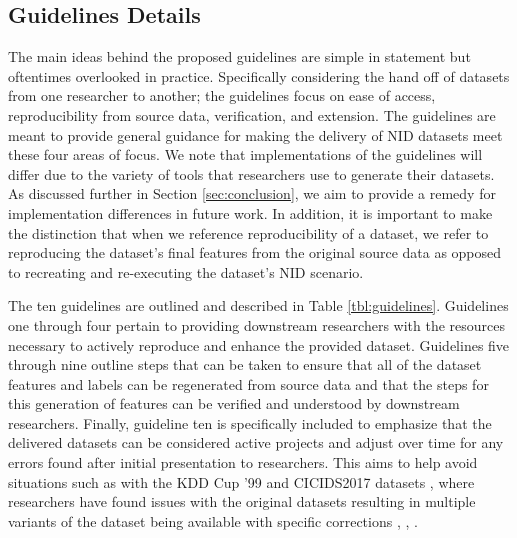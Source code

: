 \documentclass[sigconf, anonymous, screen]{acmart}
\begin{document}
\subsection{Guidelines Details}\label{subsec:framework_overview}
The main ideas behind the proposed guidelines are simple in statement but oftentimes overlooked in practice.
Specifically considering the hand off of datasets from one researcher to another; the guidelines focus on ease of access, reproducibility from source data, verification, and extension.
The guidelines are meant to provide general guidance for making the delivery of NID datasets meet these four areas of focus.
We note that implementations of the guidelines will differ due to the variety of tools that researchers use to generate their datasets.
As discussed further in Section \ref{sec:conclusion}, we aim to provide a remedy for implementation differences in future work.
In addition, it is important to make the distinction that when we reference reproducibility of a dataset, we refer to reproducing the dataset's final features from the original source data as opposed to recreating and re-executing the dataset's NID scenario.

The ten guidelines are outlined and described in Table \ref{tbl:guidelines}.
Guidelines one through four pertain to providing downstream researchers with the resources necessary to actively reproduce and enhance the provided dataset.
Guidelines five through nine outline steps that can be taken to ensure that all of the dataset features and labels can be regenerated from source data and that the steps for this generation of features can be verified and understood by downstream researchers.
Finally, guideline ten is specifically included to emphasize that the delivered datasets can be considered active projects and adjust over time for any errors found after initial presentation to researchers.
This aims to help avoid situations such as with the KDD Cup '99 \cite{kdd99} and CICIDS2017 datasets \cite{sharafaldin2018toward}, where researchers have found issues with the original datasets resulting in multiple variants of the dataset being available with specific corrections \cite{tavallaee2009detailed}, \cite{lanvin:hal-03775466}, \cite{engelen2021}.
\end{document}
